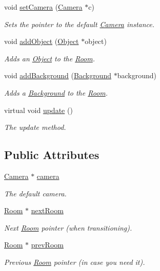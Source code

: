 \begin{DoxyCompactItemize}
void \hyperlink{class_room_aee02820d3a2a3c70d59e2f0455338cd7}{set\-Camera} (\hyperlink{class_camera}{Camera} $\ast$c)
\begin{DoxyCompactList}\small\item\em Sets the pointer to the default \hyperlink{class_camera}{Camera} instance. \end{DoxyCompactList}\item 
void \hyperlink{class_room_acf9689e04f8bc98d658d12d62b95e8bf}{add\-Object} (\hyperlink{class_object}{Object} $\ast$object)
\begin{DoxyCompactList}\small\item\em Adds an \hyperlink{class_object}{Object} to the \hyperlink{class_room}{Room}. \end{DoxyCompactList}\item 
void \hyperlink{class_room_ac9b5844f9e5e251d95ec60c3ec2bc1b6}{add\-Background} (\hyperlink{class_background}{Background} $\ast$background)
\begin{DoxyCompactList}\small\item\em Adds a \hyperlink{class_background}{Background} to the \hyperlink{class_room}{Room}. \end{DoxyCompactList}\item 
virtual void \hyperlink{class_room_a801c3de6ddff533edeb8fa68c7fcbb61}{update} ()
\begin{DoxyCompactList}\small\item\em The update method. \end{DoxyCompactList}\end{DoxyCompactItemize}
\subsection*{Public Attributes}
\begin{DoxyCompactItemize}
\item 
\hyperlink{class_camera}{Camera} $\ast$ \hyperlink{class_room_ae5dbd0283ba91cb66a53fd6f5229c4a3}{camera}
\begin{DoxyCompactList}\small\item\em The default camera. \end{DoxyCompactList}\item 
\hyperlink{class_room}{Room} $\ast$ \hyperlink{class_room_afc2baf90e55312f4a8b4967d0c7122db}{next\-Room}
\begin{DoxyCompactList}\small\item\em Next \hyperlink{class_room}{Room} pointer (when transitioning). \end{DoxyCompactList}\item 
\hyperlink{class_room}{Room} $\ast$ \hyperlink{class_room_a18aec7a7911d1d4874267f1d7dcaf1a6}{prev\-Room}
\begin{DoxyCompactList}\small\item\em Previous \hyperlink{class_room}{Room} pointer (in case you need it). \end{DoxyCompactList}\end{DoxyCompactItemize}
